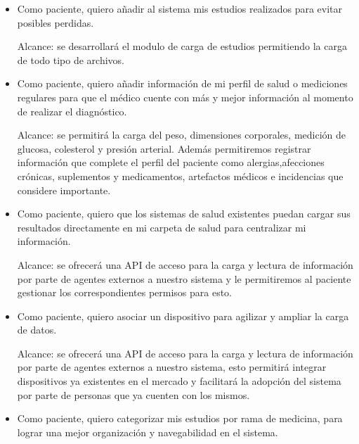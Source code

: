 	\begin{itemize}           
	\item Como paciente, quiero  añadir al sistema mis estudios realizados para evitar posibles perdidas.
    
    Alcance: se desarrollará el modulo de carga de estudios permitiendo la carga de todo tipo de archivos.
	\item Como paciente, quiero  añadir información de mi perfil de salud o mediciones regulares para que el médico cuente con más y mejor información al momento de realizar el diagnóstico.
    
    Alcance: se permitirá la carga del peso, dimensiones corporales, medición de glucosa, colesterol y presión arterial. 
    Además permitiremos registrar información que complete el perfil del paciente como alergias,afecciones crónicas, suplementos y medicamentos, artefactos médicos e incidencias que considere importante.
	\item Como paciente, quiero que los sistemas de salud existentes puedan cargar sus resultados directamente en mi carpeta de salud para centralizar mi información.
    
    Alcance: se ofrecerá una API de acceso para la carga y lectura de información por parte de agentes externos a nuestro sistema y le permitiremos al paciente gestionar los correspondientes permisos para esto.
    
	\item Como paciente, quiero asociar un dispositivo para agilizar y ampliar la carga de datos.
    
   Alcance: se ofrecerá una API de acceso para la carga y lectura de información por parte de agentes externos a nuestro sistema, esto permitirá integrar dispositivos ya existentes en el mercado y facilitará la adopción del sistema por parte de personas que ya cuenten con los mismos.
	\item Como paciente, quiero categorizar mis estudios por rama de medicina, para lograr una mejor organización y navegabilidad en el sistema.
    

\end{itemize}
